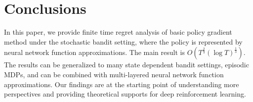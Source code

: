 \section{Conclusions}
\label{sec:conclusions}

In this paper, we provide finite time regret analysis of basic policy gradient method under the stochastic bandit setting, where the policy is represented by neural network function approximations. The main result is $O\left( T^{\frac{2}{3} } \left(\log{T}\right)^{\frac{1}{3}}\right)$. The results can be generalized to many state dependent bandit settings, episodic MDPs, and can be combined with multi-layered neural network function approximations. Our findings are at the starting point of understanding more perspectives and providing theoretical supports for deep reinforcement learning.

